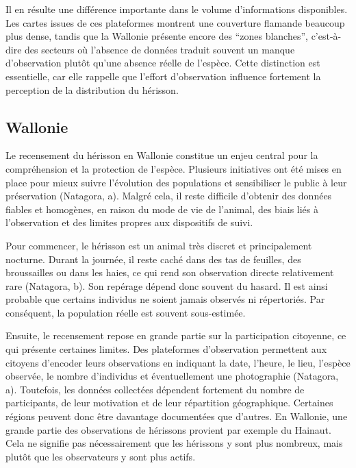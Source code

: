 \documentclass[a4paper,11pt]{article}
\begin{document}
Il en résulte une différence importante dans le volume d’informations disponibles. Les cartes issues de ces plateformes montrent une couverture flamande beaucoup plus dense, tandis que la Wallonie présente encore des \enquote{zones blanches}, c’est-à-dire des secteurs où l’absence de données traduit souvent un manque d’observation plutôt qu’une absence réelle de l’espèce. Cette distinction est essentielle, car elle rappelle que l’effort d’observation influence fortement la perception de la distribution du hérisson.

\subsection{Wallonie}

Le recensement du hérisson en Wallonie constitue un enjeu central pour la compréhension et la protection de l’espèce. Plusieurs initiatives ont été mises en place pour mieux suivre l’évolution des populations et sensibiliser le public à leur préservation (Natagora, a). Malgré cela, il reste difficile d’obtenir des données fiables et homogènes, en raison du mode de vie de l’animal, des biais liés à l’observation et des limites propres aux dispositifs de suivi.

Pour commencer, le hérisson est un animal très discret et principalement nocturne. Durant la journée, il reste caché dans des tas de feuilles, des broussailles ou dans les haies, ce qui rend son observation directe relativement rare (Natagora, b). Son repérage dépend donc souvent du hasard. Il est ainsi probable que certains individus ne soient jamais observés ni répertoriés. Par conséquent, la population réelle est souvent sous-estimée.

Ensuite, le recensement repose en grande partie sur la participation citoyenne, ce qui présente certaines limites. Des plateformes d’observation permettent aux citoyens d’encoder leurs observations en indiquant la date, l’heure, le lieu, l’espèce observée, le nombre d’individus et éventuellement une photographie (Natagora, a). Toutefois, les données collectées dépendent fortement du nombre de participants, de leur motivation et de leur répartition géographique. Certaines régions peuvent donc être davantage documentées que d’autres. En Wallonie, une grande partie des observations de hérissons provient par exemple du Hainaut. Cela ne signifie pas nécessairement que les hérissons y sont plus nombreux, mais plutôt que les observateurs y sont plus actifs.
\end{document}
